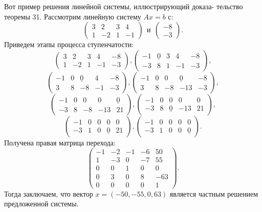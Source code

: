 \documentclass{mai_book}
\begin{document}
	Вот пример решения линейной системы, иллюстрирующий доказа-\linebreak
	тельство теоремы 31. Рассмотрим линейную систему $Ax = b$ с:\linebreak
	$$\begin{pmatrix} 3 & 2 & 3 & 4 \\ 1 & -2 & 1 & -1 \end{pmatrix} \ \ \text{и} \ \ \begin{pmatrix} -8 \\ -3 \end{pmatrix}.$$
	Приведем этапы процесса ступенчатости:
	$$\begin{pmatrix} 3 & 2 & 3 & 4 & -8 \\ 1 & -2 & 1 & -1 & -3 \end{pmatrix}, \begin{pmatrix} -1 & \underline{0} & 3 & 4 & -8 \\ -3 & 8 & 1 & -1 & -3 \end{pmatrix},$$
	$$\begin{pmatrix} -1 & 0 & \underline{0} & 4 & -8 \\ 3 & 8 & -8 & -1 & -3 \end{pmatrix}, \begin{pmatrix} -1 & 0 & 0 & \underline{0} & -8 \\ 3 & 8 & -8 & -13 & -3 \end{pmatrix},$$
	$$\begin{pmatrix} -1 & 0 & 0 & 0 & \underline{0} \\ -3 & 8 & -8 & -13 & 21 \end{pmatrix}, \begin{pmatrix} -1 & 0 & 0 & 0 & 0 \\ -3 & 8 & \underline{0} & -13 & 21 \end{pmatrix},$$
	$$\begin{pmatrix} -1 & 0 & 0 & 0 & 0 \\ -3 & 1 & 0 & \underline{0} & 21 \end{pmatrix}, \begin{pmatrix} -1 & 0 & 0 & 0 & 0 \\ -3 & 1 & 0 & 0 & \underline{0} \end{pmatrix}.$$
	Получена правая матрица перехода:
	$$\begin{pmatrix} -1 & -2 & -1 & -6 & 50 \\ 1 & -3 & 0 & -7 & 55 \\ 0 & 0 & 1 & 0 & 0 \\ 0 & 3 & 0 & 8 & -63 \\ 0 & 0 & 0 & 0 & 1\end{pmatrix}.$$
	Тогда заключаем, что вектор $x = (-50, -55, 0, 63)$ является частным\linebreak
	решением предложенной системы. 
	
\end{document}
